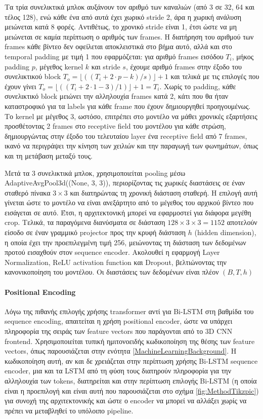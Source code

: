 Τα τρία συνελικτικά μπλοκ αυξάνουν τον αριθμό των καναλιών (από 3 σε 32, 64 και τέλος 128), ενώ κάθε ένα από αυτά έχει χωρικό stride 2, άρα η χωρική ανάλυση μειώνεται κατά 8 φορές. Αντιθέτως, το χρονικό stride είναι 1, έτσι ώστε να μη μειώνεται σε καμία περίπτωση ο αριθμός των frames. Η διατήρηση του αριθμού των frames κάθε βίντεο δεν οφείλεται αποκλειστικά στο βήμα αυτό, αλλά και στο temporal padding με τιμή 1 που εφαρμόζεται: για αριθμό frames εισόδου $T_i$, μήκος padding $p$, μέγεθος kernel $k$ και stride $s$, έχουμε αριθμό frames στην έξοδο του συνελικτικού block $T_o = \lfloor((T_i + 2\cdot p - k) / s) \rfloor + 1$ και τελικά με τις επιλογές που έχουν γίνει $T_o = \lfloor((T_i + 2\cdot 1 - 3) / 1) \rfloor + 1 = T_i$. Χωρίς το padding, κάθε συνελικτικό block μειώνει την αλληλουχία frames κατά 2, κάτι που θα ήταν καταστροφικό για τα labels για κάθε frame που έχουν δημιουργηθεί προηγουμένως. Το kernel με μέγεθος 3, ωστόσο, επιτρέπει στο μοντέλο να μάθει χρονικές εξαρτήσεις προσθέτοντας 2 frames στο receptive field του μοντέλου για κάθε στρώση, δημιουργώντας στην έξοδο του τελευταίου layer ένα receptive field από 7 frames, ικανό να περιγράψει την κίνηση των χειλιών και την παραγωγή των φωνημάτων, όπως και τη μετάβαση μεταξύ τους.

Μετά τα 3 συνελικτικά μπλοκ, χρησιμοποιείται pooling μέσω AdaptiveAvgPool3d((None, 3, 3)), περιορίζοντας τις χωρικές διαστάσεις σε έναν σταθερό πίνακα $3\times3$ και διατηρώντας τη χρονική διάσταση σταθερή. Η επιλογή αυτή γίνεται ώστε το μοντέλο να είναι ανεξάρτητο από το μέγεθος του αρχικού βίντεο που εισάγεται σε αυτό. Έτσι, η αρχιτεκτονική μπορεί να εφαρμοστεί για διάφορα μεγέθη crop. Τελικά, τα παραγόμενα διανύσματα σε διάσταση $128\times3\times3 = 1152$ αποτελούν είσοδο σε έναν γραμμικό projector προς την κρυφή διάσταση $h$ (hidden dimension), η οποία έχει την προεπιλεγμένη τιμή 256, μειώνοντας τη διάσταση των δεδομένων προτού εισαχθούν στον sequence encoder. Ακολουθεί η εφαρμογή Layer Normalization, ReLU activation function και Dropout, βελτιώνοντας την κανονικοποίηση του μοντέλου. Οι διαστάσεις των δεδομένων είναι πλέον $(B,T,h)$

\paragraph{Positional Encoding}

Λόγω της πιθανής επιλογής χρήσης transformer αντί για Bi-LSTM στη βαθμίδα του sequence encoding, απαιτείται η χρήση positional encoder, ώστε να υπάρχει πληροφορία της σειράς των feature vectors που παράγονται από το 3D CNN frontend. Χρησιμοποιείται τυπική ημιτονοειδής κωδικοποίηση της θέσης των feature vectors, όπως παρουσιάζεται στην ενότητα \ref{MachineLearningBackground}. Η κωδικοποίηση αυτή, αν και δε χρειάζεται στην περίπτωση χρήσης Bi-LSTM sequence encoder, μια και τα LSTM από τη φύση τους διατηρούν πληροφορία για την αλληλουχία των tokens, διατηρείται και στην περίπτωση επιλογής Bi-LSTM (η οποία είναι η προεπιλογή και είναι αυτή που παρουσιάζεται στο σχήμα \ref{fig:MethodTikzpic}) για συνοχή της αρχιτεκτονικής και ώστε ο encoder να μπορεί να αλλάξει χωρίς να πρέπει να μεταβληθεί το υπόλοιπο pipeline.

